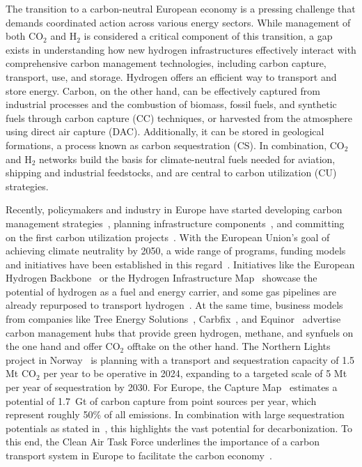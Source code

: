 \documentclass[twocolumn]{article}
\newcommand{\COtwo}{CO$_2$}
\newcommand{\Htwo}{H$_2$}
\begin{document}
The transition to a carbon-neutral European economy is a pressing challenge that demands coordinated action across various energy sectors. While management of both \COtwo{} and \Htwo{} is considered a critical component of this transition, a gap exists in understanding how new hydrogen infrastructures effectively interact with comprehensive carbon management technologies, including carbon capture, transport, use, and storage. Hydrogen offers an efficient way to transport and store energy. Carbon, on the other hand, can be effectively captured from industrial processes and the combustion of biomass, fossil fuels, and synthetic fuels through carbon capture (CC) techniques, or harvested from the atmosphere using direct air capture (DAC). Additionally, it can be stored in geological formations, a process known as carbon sequestration (CS). In combination, \COtwo{} and \Htwo{} networks build the basis for climate-neutral fuels needed for aviation, shipping and industrial feedstocks, and are central to carbon utilization (CU) strategies.

Recently, policymakers and industry in Europe have started developing carbon management strategies~\cite{GermanyDevelopingStrategy2023,CarbonManagementStrategie}, planning infrastructure components~\cite{CONetz}, and committing on the first carbon utilization projects~\cite{EFuelsPilotPlant2022,OrstedAssumesFull,GROUNDBREAKINGEFUELPRODUCTION,DLREfuelsDLR}. With the European Union's goal of achieving climate neutrality by 2050, a wide range of programs, funding models and initiatives have been established in this regard~\cite{eu2023netzero,europeangreendeal,europeaninnovationfund}. Initiatives like the European Hydrogen Backbone~\cite{gasforclimateEuropeanHydrogenBackbone2022} or the Hydrogen Infrastructure Map~\cite{H2InfrastructureMap} showcase the potential of hydrogen as a fuel and energy carrier, and some gas pipelines are already repurposed to transport hydrogen~\cite{RohrFreiFuer}. At the same time, business models from companies like Tree Energy Solutions~\cite{TESHydrogenLife2023}, Carbfix~\cite{WeTurnCO2}, and Equinor~\cite{adomaitisEquinorRWEBuild2023} advertise carbon management hubs that provide green hydrogen, methane, and synfuels on the one hand and offer \COtwo{} offtake on the other hand. The Northern Lights project in Norway~\cite{NorthernLightsWhat} is planning with a transport and sequestration capacity of 1.5 Mt \COtwo{} per year  to be operative in 2024, expanding to a targeted scale of 5 Mt per year of sequestration by 2030.
For Europe, the Capture Map~\cite{ToolsGreenTransition} estimates a potential of 1.7~Gt of carbon capture from point sources per year, which represent roughly 50\% of all emissions. In combination with large sequestration potentials as stated in~\cite{weiProposedGlobalLayout2021}, this highlights the vast potential for decarbonization.
To this end, the Clean Air Task Force underlines the importance of a carbon transport system in Europe to facilitate the carbon economy~\cite{lockwoodEuropeanStrategyCarbon}.
\end{document}
